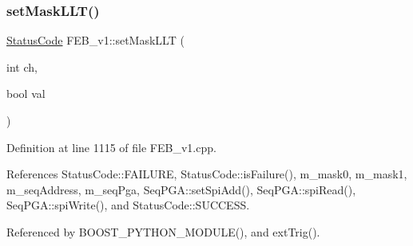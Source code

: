 \subsubsection{\texorpdfstring{set\+Mask\+L\+L\+T()}{setMaskLLT()}}
{\footnotesize\ttfamily \hyperlink{classStatusCode}{Status\+Code} F\+E\+B\+\_\+v1\+::set\+Mask\+L\+LT (\begin{DoxyParamCaption}\item[{int}]{ch,  }\item[{bool}]{val }\end{DoxyParamCaption})}



Definition at line 1115 of file F\+E\+B\+\_\+v1.\+cpp.



References Status\+Code\+::\+F\+A\+I\+L\+U\+RE, Status\+Code\+::is\+Failure(), m\+\_\+mask0, m\+\_\+mask1, m\+\_\+seq\+Address, m\+\_\+seq\+Pga, Seq\+P\+G\+A\+::set\+Spi\+Add(), Seq\+P\+G\+A\+::spi\+Read(), Seq\+P\+G\+A\+::spi\+Write(), and Status\+Code\+::\+S\+U\+C\+C\+E\+SS.



Referenced by B\+O\+O\+S\+T\+\_\+\+P\+Y\+T\+H\+O\+N\+\_\+\+M\+O\+D\+U\+L\+E(), and ext\+Trig().


